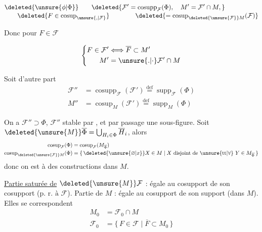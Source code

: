 \[
\begin{aligned}
&\deleted{\unsure{\phi|\Phi}}\qquad
\deleted{\mathcal F'=\operatorname{cosupp}_{\mathcal F}(\Phi),\quad M'=\mathcal F'\cap M,}\\[-2pt]
&\qquad\deleted{F\in\operatorname{cosup}_{\unsure{,|\mathcal F}}}
\qquad\qquad\deleted{=\operatorname{cosup}_{\deleted{\unsure{\mathcal F}}M}(\mathcal F)}
\end{aligned}
\]

Donc pour $F\in\mathcal F$

\[
\left\{\begin{aligned}
F\in\mathcal F'&\Longleftrightarrow\overline F\subset M'\\
M'&=\unsure{.|\cdot}\mathcal F'\cap M
\end{aligned}\right.
\]

Soit d'autre part
\[
\begin{aligned}
\mathcal F''&=\operatorname{cosupp}_{\mathcal F}(\mathcal F')\overset{\text{def}}{=}\operatorname{supp}_{\mathcal F}(\Phi)\\
M''&=\operatorname{cosup}_{M}(\mathcal F')\overset{\text{def}}{=}\operatorname{supp}_{M}(\Phi)
\end{aligned}
\]

On a  $\mathcal F''\supset\Phi$, $\mathcal F''$ stable par ,  et par passage  une sous-figure. Soit $\deleted{\unsure{M}} \overline\Phi=\bigcup_{H_i\in\Phi}\overline H_i$, alors
\[
\begin{aligned}
\operatorname{cosup}_{\mathcal F}(\Phi)&=\operatorname{cosup}_{\mathcal F}(M_{\overline\Phi})\\
\operatorname{cosup}_{\deleted{\unsure{\mathcal F}}M}(\Phi)&=\{\,\deleted{\unsure{\varnothing|x}}X\in M\mid X\ \text{disjoint de }\unsure{\mathrm{tt}|\forall}\ Y\in M_{\overline\Phi}\,\}
\end{aligned}
\]
donc on est  à des constructions dans $M$. 

\uline{Partie saturée  de} $\deleted{\unsure{M}}\mathcal F$ : égale au cosupport de son cosupport ($\text{p. r. à }\mathcal F$). Partie   de $M$ : égale au cosupport de son support (dans $M$). Elles se correspondent  
\[
\begin{aligned}
M_0&=\mathcal F_0\cap M\\
\mathcal F_0&=\{\,F\in\mathcal F\mid\overline F\subset M_0\,\}
\end{aligned}
\]


